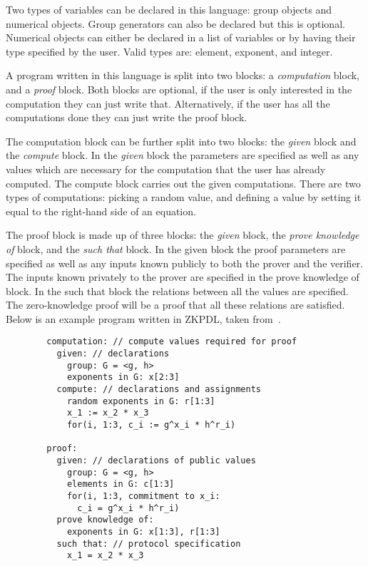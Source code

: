 \documentclass{sig-alternate}
\begin{document}
		Two types of variables can be declared in this language: group objects
		and numerical objects. Group generators can also be declared but this 
		is optional. Numerical objects can either be declared in a list of variables
		or by having their type specified by the user. Valid types are: element,
		exponent, and integer.
		
		A program written in this language is split into two blocks: a \textit{computation} block,
		and a \textit{proof} block. Both blocks are optional, if the user is only interested in the
		computation they can just write that. Alternatively, if the user has all the computations
		done they can just write the proof block. 
		
		The computation block can be further split into two blocks: the \textit{given} block
		and the \textit{compute} block. In the \textit{given} block the parameters are specified
		as well as any values which are necessary for the computation that the user has already
		computed. The compute block carries out the given computations. There are two
		types of computations: picking a random value, and defining a value by setting it
		equal to the right-hand side of an equation.
		
		The proof block is made up of three blocks: the \textit{given} block, the 
		\textit{prove knowledge of} block, and the \textit{such that} block. In the
		given block the proof parameters are specified as well as any inputs
		known publicly to both the prover and the verifier. The inputs known privately to
		the prover are specified in the prove knowledge of block. In the 
		such that block the relations between all the values are specified.
		The zero-knowledge proof will be a proof that all these relations are satisfied.
		Below is an example program written in ZKPDL, taken from~\cite{ZKPDL:2010}.
		
		\begin{verbatim}
		computation: // compute values required for proof
		  given: // declarations
		    group: G = <g, h>
		    exponents in G: x[2:3]
		  compute: // declarations and assignments
		    random exponents in G: r[1:3]
		    x_1 := x_2 * x_3
		    for(i, 1:3, c_i := g^x_i * h^r_i)
		    
		proof:
		  given: // declarations of public values
		    group: G = <g, h>
		    elements in G: c[1:3]
		    for(i, 1:3, commitment to x_i:
		      c_i = g^x_i * h^r_i)
		  prove knowledge of: 
		    exponents in G: x[1:3], r[1:3]
		  such that: // protocol specification
		    x_1 = x_2 * x_3
		\end{verbatim}
		
\end{document}
